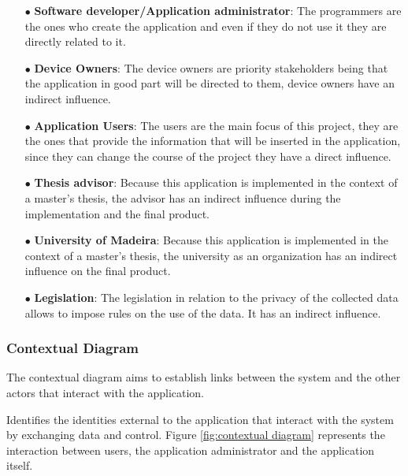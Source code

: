 \begin{itemize}
    \item[$\bullet$] \textbf{Software developer/Application administrator}: The programmers are the ones who create the application and even if they do not use it they are directly related to it.
    \item[$\bullet$] \textbf{\hyperlink{\acronym}{\acronym} Device Owners}: The device owners are priority stakeholders being that the application in good part will be directed to them, device owners have an indirect influence.
    \item[$\bullet$] \textbf{Application Users}: The users are the main focus of this project, they are the ones that provide the information that will be inserted in the application, since they can change the course of the project they have a direct influence.
    \item[$\bullet$] \textbf{Thesis advisor}: Because this application is implemented in the context of a master's thesis, the advisor has an indirect influence during the implementation and the final product.
    \item[$\bullet$] \textbf{University of Madeira}: Because this application is implemented in the context of a master's thesis, the university as an organization has an indirect influence on the final product.
    \item[$\bullet$] \textbf{Legislation}: The legislation in relation to the privacy of the collected data allows to impose rules on the use of the data. It has an indirect influence.
\end{itemize}

\subsubsection{Contextual Diagram}

The contextual diagram aims to establish links between the system
and the other actors that interact with the application.

Identifies the identities external to the application that interact with
the system by exchanging data and control.
Figure \ref{fig:contextual diagram} represents the interaction between users, the
application administrator and the application itself.

